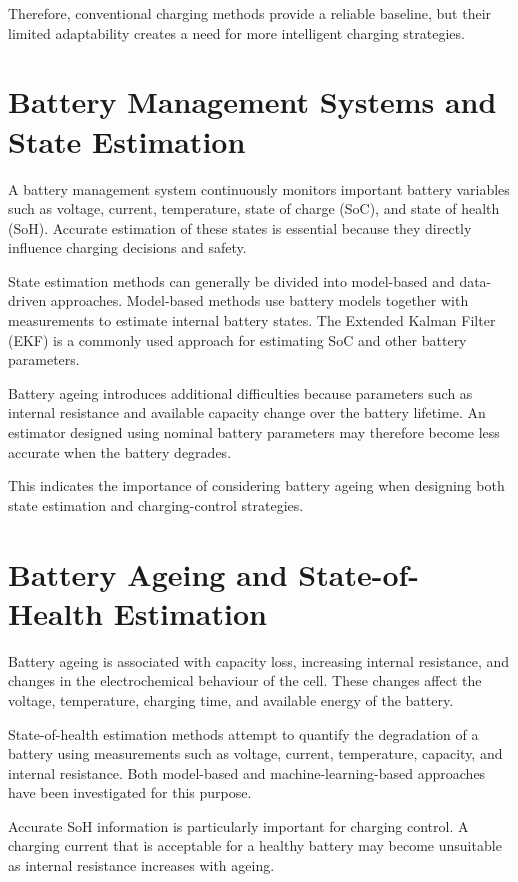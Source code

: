 Therefore, conventional charging methods provide a reliable baseline,
but their limited adaptability creates a need for more intelligent
charging strategies.

\section{Battery Management Systems and State Estimation}

A battery management system continuously monitors important battery
variables such as voltage, current, temperature, state of charge (SoC),
and state of health (SoH). Accurate estimation of these states is
essential because they directly influence charging decisions and safety.

State estimation methods can generally be divided into model-based and
data-driven approaches. Model-based methods use battery models together
with measurements to estimate internal battery states. The Extended
Kalman Filter (EKF) is a commonly used approach for estimating SoC and
other battery parameters.

Battery ageing introduces additional difficulties because parameters
such as internal resistance and available capacity change over the
battery lifetime. An estimator designed using nominal battery
parameters may therefore become less accurate when the battery
degrades.

This indicates the importance of considering battery ageing when
designing both state estimation and charging-control strategies.

\section{Battery Ageing and State-of-Health Estimation}

Battery ageing is associated with capacity loss, increasing internal
resistance, and changes in the electrochemical behaviour of the cell.
These changes affect the voltage, temperature, charging time, and
available energy of the battery.

State-of-health estimation methods attempt to quantify the degradation
of a battery using measurements such as voltage, current, temperature,
capacity, and internal resistance. Both model-based and
machine-learning-based approaches have been investigated for this
purpose.

Accurate SoH information is particularly important for charging
control. A charging current that is acceptable for a healthy battery
may become unsuitable as internal resistance increases with ageing.


